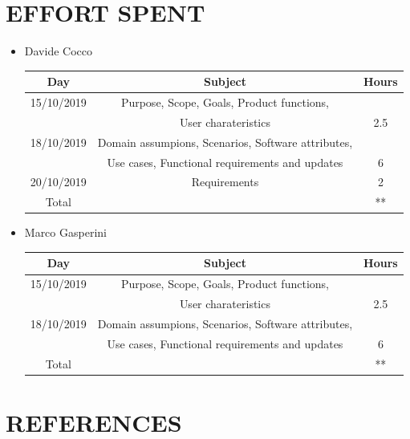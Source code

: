 \documentclass[12pt,a4paper]{article}
\begin{document}
\section{EFFORT	SPENT}
\begin{itemize}
\item {Davide Cocco}
 \begin{center}
			\begin{tabular}{| c | c | c |}
				\hline
				Day & Subject & Hours \\ \hline
				15/10/2019 & Purpose, Scope, Goals, Product functions,\\
				&User charateristics & 2.5 \\
				18/10/2019 & Domain assumpions, Scenarios, Software attributes, \\
				& Use cases, Functional requirements and updates  & 6\\
				20/10/2019 & Requirements  & 2\\	
				\hline
				Total & & ** \\
				\hline
			\end{tabular}
		\end{center}
\item {Marco Gasperini}
\begin{center}
			\begin{tabular}{| c | c | c |}
				\hline
				Day & Subject & Hours \\ \hline
				15/10/2019 & Purpose, Scope, Goals, Product functions,\\
				&User charateristics & 2.5 \\
				18/10/2019 & Domain assumpions, Scenarios, Software attributes, \\
				& Use cases, Functional requirements and updates  & 6\\
				\hline
				Total & & ** \\
				\hline
			\end{tabular}
\end{center}
\end{itemize}
\section{REFERENCES}
\end{document}
